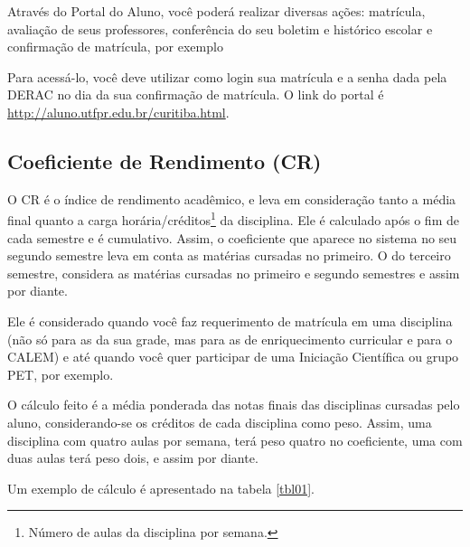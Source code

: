 \documentclass[a4paper,12pt,openany]{article}
\begin{document}
Através do Portal do Aluno, você poderá realizar diversas ações: matrícula, avaliação de seus professores, conferência do seu boletim e histórico escolar e confirmação de matrícula, por exemplo

Para acessá-lo, você deve utilizar como login sua matrícula e a senha dada pela DERAC no dia da sua confirmação de matrícula. O link do portal é \url{http://aluno.utfpr.edu.br/curitiba.html}.



\subsection{Coeficiente de Rendimento (CR)}

O CR é o índice de rendimento acadêmico, e leva em consideração tanto a média final quanto a carga horária/créditos\footnote{Número de aulas da disciplina por semana.} da disciplina. Ele é calculado após o fim de cada semestre e é cumulativo. Assim, o coeficiente que aparece no sistema no seu segundo semestre leva em conta as matérias cursadas no primeiro. O do terceiro semestre, considera as matérias cursadas no primeiro e segundo semestres e assim por diante.

Ele é considerado quando você faz requerimento de matrícula em uma disciplina (não só para as da sua grade, mas para as de enriquecimento curricular e para o CALEM) e até quando você quer participar de uma Iniciação Científica ou grupo PET, por exemplo.

O cálculo feito é a média ponderada das notas finais das disciplinas cursadas pelo aluno, considerando-se os créditos de cada disciplina como peso. Assim, uma disciplina com quatro aulas por semana, terá peso quatro no coeficiente, uma com duas aulas terá peso dois, e assim por diante.

Um exemplo de cálculo é apresentado na tabela \ref{tbl01}.
\end{document}
